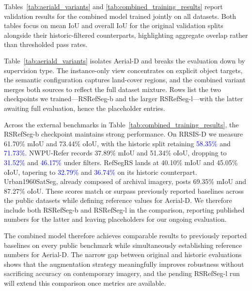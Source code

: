 Tables~\ref{tab:aeriald_variants} and \ref{tab:combined_training_results} report validation results for the combined model trained jointly on all datasets. Both tables focus on mean IoU and overall IoU for the original validation splits alongside their historic-filtered counterparts, highlighting aggregate overlap rather than thresholded pass rates.

Table~\ref{tab:aeriald_variants} isolates Aerial-D and breaks the evaluation down by supervision type. The instance-only view concentrates on explicit object targets, the semantic configuration captures land-cover regions, and the combined variant merges both sources to reflect the full dataset mixture. Rows list the two checkpoints we trained—RSRefSeg-b and the larger RSRefSeg-l—with the latter awaiting full evaluation, hence the placeholder entries.

Across the external benchmarks in Table~\ref{tab:combined_training_results}, the RSRefSeg-b checkpoint maintains strong performance. On RRSIS-D we measure 61.70\% mIoU and 73.44\% oIoU, with the historic split retaining \textcolor{blue}{58.35\%} and \textcolor{blue}{71.73\%}. NWPU-Refer records 37.89\% mIoU and 51.34\% oIoU, dropping to \textcolor{blue}{31.52\%} and \textcolor{blue}{46.17\%} under filters. RefSegRS lands at 40.10\% mIoU and 45.05\% oIoU, tapering to \textcolor{blue}{32.79\%} and \textcolor{blue}{36.74\%} on its historic counterpart. Urban1960SatSeg, already composed of archival imagery, posts 69.35\% mIoU and 87.27\% oIoU. These scores match or surpass previously reported baselines across the public datasets while defining reference values for Aerial-D. We therefore include both RSRefSeg-b and RSRefSeg-l in the comparison, reporting published numbers for the latter and leaving placeholders for our ongoing evaluation.

The combined model therefore achieves comparable results to previously reported baselines on every public benchmark while simultaneously establishing reference numbers for Aerial-D. The narrow gap between original and historic evaluations shows that the augmentation strategy meaningfully improves robustness without sacrificing accuracy on contemporary imagery, and the pending RSRefSeg-l run will extend this comparison once metrics are available.

